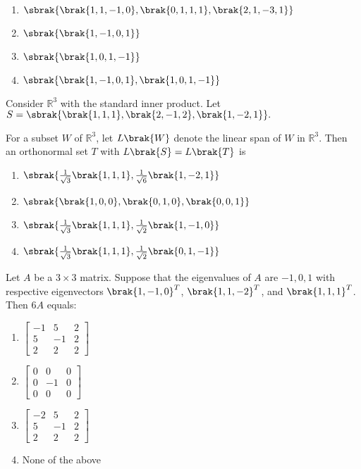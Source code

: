     \begin{enumerate}
        \item $\sbrak{\brak{1, 1, -1, 0}, \brak{0, 1, 1, 1}, \brak{2, 1, -3, 1}}$
        \item $\sbrak{\brak{1, -1, 0, 1}}$
        \item $\sbrak{\brak{1, 0, 1, -1}}$
        \item $\sbrak{\brak{1, -1, 0, 1}, \brak{1, 0, 1, -1}}$
    \end{enumerate}
    

   \item Consider $\mathbb{R}^3$ with the standard inner product. Let
   $S=\sbrak{\brak{1,1,1}, \brak{2,-1,2}, \brak{1,-2,1}}.$

    For a subset $W$ of $\mathbb{R}^3$, let $L\brak{W}$ denote the linear span of $W$ in $\mathbb{R}^3$. Then an orthonormal set $T$ with $L\brak{S}=L\brak{T}$ is 
  
    \begin{enumerate}
      \item $\sbrak{\frac{1}{\sqrt{3}}\brak{1,1,1}, \frac{1}{\sqrt{6}}\brak{1,-2,1}}$
      \item $\sbrak{\brak{1,0,0}, \brak{0,1,0}, \brak{0,0,1}}$
      \item $\sbrak{\frac{1}{\sqrt{3}}\brak{1,1,1}, \frac{1}{\sqrt{2}}\brak{1,-1,0}}$
      \item $\sbrak{\frac{1}{\sqrt{3}}\brak{1,1,1}, \frac{1}{\sqrt{2}}\brak{0,1,-1}}$
    \end{enumerate}

  \item Let $A$ be a $3\times3$ matrix. Suppose that the eigenvalues of $A$ are $-1,0,1$ with respective
eigenvectors $\brak{1,-1,0}^T$, $\brak{1,1,-2}^T$, and $\brak{1,1,1}^T$. Then $6A$ equals:

    \begin{enumerate}
      \item $\begin{bmatrix}
        -1 & 5 & 2 \\
        5 & -1 & 2 \\
        2 & 2 & 2
      \end{bmatrix}$
      \item $\begin{bmatrix}
        0 & 0 & 0 \\
        0 & -1 & 0 \\
        0 & 0 & 0
      \end{bmatrix}$
      \item $\begin{bmatrix}
        -2 & 5 & 2 \\
        5 & -1 & 2 \\
        2 & 2 & 2
      \end{bmatrix}$
      \item None of the above
    \end{enumerate}


